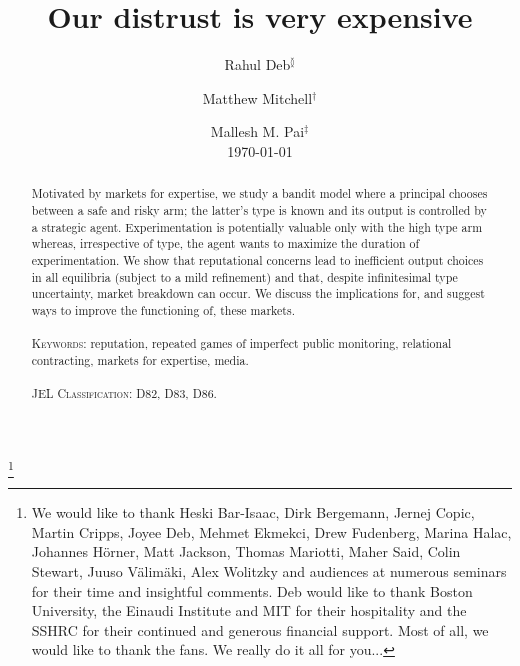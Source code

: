 \documentclass[11pt,reqno]{amsart}
\begin{document}
\title[Our distrust is very expensive]{Our distrust is very expensive}

\author[Deb]{Rahul Deb$^{\between}$}
\address{$^{\between}$Department of Economics, University of Toronto\\\href{mailto:rahul.deb@utoronto.ca}{rahul.deb@utoronto.ca}}
\author[Mitchell]{Matthew Mitchell$^{\dagger}$}
\address{$^{\dagger}$Rotman Business School, University of Toronto\\\href{mailto:matthew.mitchell@rotman.utoronto.ca}{matthew.mitchell@rotman.utoronto.ca}}
\author[Pai]{Mallesh M. Pai$^{\ddag}$\\\today}
\address{$^{\ddag}$Department of Economics, Rice University\\\href{mailto:mallesh.pai@rice.edu}{mallesh.pai@rice.edu}}


\thanks{We would like to thank Heski Bar-Isaac, Dirk Bergemann, Jernej Copic, Martin Cripps, Joyee Deb, Mehmet Ekmekci, Drew Fudenberg, Marina Halac, Johannes H\"orner, Matt Jackson, Thomas Mariotti, Maher Said, Colin Stewart, Juuso V\"alim\"aki, Alex Wolitzky and audiences at numerous seminars for their time and insightful comments. Deb would like to thank Boston University, the Einaudi Institute and MIT for their hospitality and the SSHRC for their continued and generous financial support. Most of all, we would like to thank the fans. We really do it all for you...}

\begin{abstract}
Motivated by markets for expertise, we study a bandit model where a principal chooses between a safe and risky arm; the latter's type is known and its output is controlled by a strategic agent. Experimentation is potentially valuable only with the high type arm whereas, irrespective of type, the agent wants to maximize the duration of experimentation. We show that reputational concerns lead to inefficient output choices in all equilibria (subject to a mild refinement) and that, despite infinitesimal type uncertainty, market breakdown can occur. We discuss the implications for, and suggest ways to improve the functioning of, these markets.
\\
\\
\noindent
\textsc{Keywords:} reputation, repeated games of imperfect public monitoring, relational contracting, markets for expertise, media.
\\
\\
\noindent
\textsc{JEL Classification:}
D82, %
D83, %
D86. %
\end{abstract}
\end{document}
